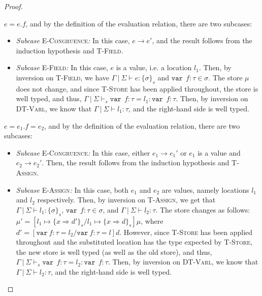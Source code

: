 \documentclass{llncs}
\newcommand{\keywadj}[1]{\mathtt{#1}}
\newcommand{\keyw}[1]{\keywadj{#1}~}
\newcommand{\pcase}[1][]{
  \if\relax\detokenize{#1}\relax
    \def\thiscase{}
  \else
    \def\thiscase{~#1}
  \fi
  \item
}
\begin{document}
\begin{proof}
\begin{pcases}
\pcase[\textsc{T-Field}]
$e = e.f$, and by the definition of the evaluation relation, there are two subcases:
\\
\begin{itemize}
\item[]  \textit{Subcase} \textsc{E-Congruence}\textit{:} In this case, $e \longrightarrow e'$, and the result follows from the induction hypothesis and \textsc{T-Field}.
\\
\item[]  \textit{Subcase} \textsc{E-Field}\textit{:} In this case, $e$ is a value, i.e. a location $l_1$. Then, by inversion on  \textsc{T-Field}, we have $\Gamma~|~\Sigma \vdash e : \{\sigma\}_s$ and $\keyw{var}~ f : \tau \in \sigma$. The store $\mu$ does not change, and since \textsc{T-Store} has been applied throughout, the store is well typed, and thus, \mbox{$\Gamma~|~\Sigma \vdash_s \keyw{var}~ f : \tau = l_1 : \keyw{var}~ f : \tau$}. Then, by inversion on \textsc{DT-Varl}, we know that $\Gamma~|~\Sigma \vdash l_1 : \tau$, and the right-hand side is well typed.
\\
\end{itemize}

\pcase[\textsc{T-Assign}]
$e = e_1.f=e_2$, and by the definition of the evaluation relation, there are two subcases:
\\
\begin{itemize}
\item[]  \textit{Subcase} \textsc{E-Congruence}\textit{:} In this case, either $e_1 \longrightarrow e_1'$ or $e_1$ is a value and $e_2 \longrightarrow e_2'$. Then, the result follows from the induction hypothesis and \textsc{T-Assign}.
\\
\item[]  \textit{Subcase} \textsc{E-Assign}\textit{:} In this case, both $e_1$ and $e_2$ are values, namely locations $l_1$ and $l_2$ respectively. Then, by inversion on \textsc{T-Assign}, we get that $\Gamma~|~\Sigma \vdash l_1 : \{\sigma\}_s$, $\keyw{var}~ f : \tau \in \sigma$, and $\Gamma~|~\Sigma \vdash l_2 : \tau$. The store changes as follows: $\mu' = [l_1 \mapsto \{ x \Rightarrow d' \}_{s}/l_1 \mapsto \{ x \Rightarrow d \}_{s}]\mu$, where $d' = [\keyw{var} f:\tau = l_2/\keyw{var} f:\tau = l]d$. However, since \textsc{T-Store} has been applied throughout and the substituted location has the type expected by \textsc{T-Store}, the new store is well typed (as well as the old store), and thus, \mbox{$\Gamma~|~\Sigma \vdash_s \keyw{var}~ f : \tau = l_2 : \keyw{var}~ f : \tau$}. Then, by inversion on \textsc{DT-Varl}, we know that $\Gamma~|~\Sigma \vdash l_2 : \tau$, and the right-hand side is well typed.


\end{itemize}
\end{pcases}
\end{proof}
\end{document}
